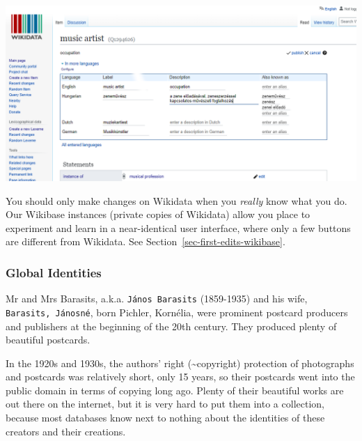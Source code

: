 \documentclass[
  letterpaper,
  DIV=11,
  numbers=noendperiod]{scrreprt}
\begin{document}
\begin{center}
\includegraphics{png/wikidata/add_new_translation_wikidata_2x1.png}
\end{center}

\begin{tcolorbox}[enhanced jigsaw, opacityback=0, bottomrule=.15mm, rightrule=.15mm, toptitle=1mm, breakable, colbacktitle=quarto-callout-caution-color!10!white, colback=white, title=\textcolor{quarto-callout-caution-color}{\faFire}\hspace{0.5em}{Caution}, leftrule=.75mm, toprule=.15mm, left=2mm, arc=.35mm, colframe=quarto-callout-caution-color-frame, coltitle=black, titlerule=0mm, bottomtitle=1mm, opacitybacktitle=0.6]

You should only make changes on Wikidata when you \emph{really} know
what you do. Our Wikibase instances (private copies of Wikidata) allow
you place to experiment and learn in a near-identical user interface,
where only a few buttons are different from Wikidata. See
Section~\ref{sec-first-edits-wikibase}.

\end{tcolorbox}

\subsubsection{Global Identities}\label{global-identities}

Mr and Mrs Barasits, a.k.a. \texttt{János\ Barasits} (1859-1935) and his
wife, \texttt{Barasits,\ Jánosné}, born Pichler, Kornélia, were
prominent postcard producers and publishers at the beginning of the 20th
century. They produced plenty of beautiful postcards.

In the 1920s and 1930s, the authors' right (\textasciitilde copyright)
protection of photographs and postcards was relatively short, only 15
years, so their postcards went into the public domain in terms of
copying long ago. Plenty of their beautiful works are out there on the
internet, but it is very hard to put them into a collection, because
most databases know next to nothing about the identities of these
creators and their creations.
\end{document}
